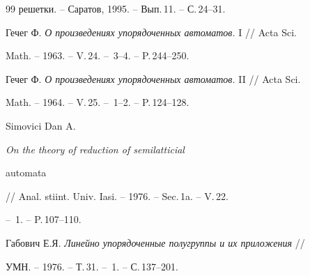 \begin{thebibliography}{99}
решетки. -- Саратов, 1995. -- Вып.\,11. -- С.\,24--31.




Гечег Ф. {\em О произведениях упорядоченных автоматов. } I // Acta Sci.


Math. -- 1963. -- V.\,24. -- \No\,3--4. -- P.\,244--250.




Гечег Ф. {\em О произведениях упорядоченных автоматов. } II // Acta Sci.


Math. -- 1964. -- V.\,25. -- \No\,1--2. -- P.\,124--128.




Simovici Dan A. {\em On the theory of reduction of semilatticial


automata} // Anal. stiint. Univ. Iasi. -- 1976. -- Sec.\,1a. -- V.\,22.


-- \No\,1. -- P.\,107--110.




Габович Е.Я. {\em Линейно упорядоченные полугруппы и их приложения} //


УМН. -- 1976. -- Т.\,31. -- \No\,1. -- С.\,137--201.





\end{thebibliography}





\vskip 2cm















